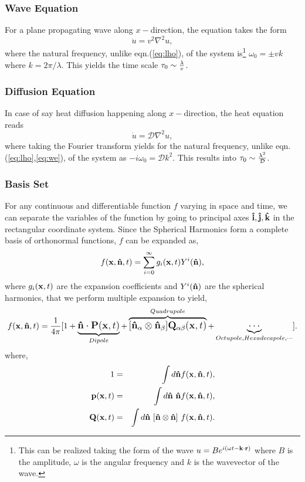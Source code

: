 \documentclass[onecolumn,12pt]{article}
\begin{document}
\subsubsection{Wave Equation}
For a plane propagating wave along $x-$direction, the equation takes the form
\begin{equation}
\label{eq:we}
\boxed{\ddot{u} = v^2 \nabla^2 u}, 
\end{equation}
where the natural frequency, unlike eqn.(\ref{eq:lho}), of the system is\footnote{This can be realized taking the form of the wave $u = Be^{i(\omega t-{\bf k}\cdot {\bf r})}$ where $B$ is the amplitude, $\omega$ is the angular frequency and $k$ is the wavevector of the wave.} $\omega_0 = \pm vk$ where $k = 2\pi/\lambda$. This yields the time scale $\tau_0 \sim {\lambda \over v}$.

\subsubsection{Diffusion Equation}
In case of say heat diffusion happening along $x-$direction, the heat equation reads
\begin{equation}
\label{eq:de}
\boxed{\dot{u} = \mathcal{D} \nabla^2 u}, 
\end{equation}
where taking the Fourier transform yields for the natural frequency, unlike eqn.(\ref{eq:lho},\ref{eq:we}), of the system as $-i\omega_0 = \mathcal{D} k^2$. This results into $\tau_0 \sim {\lambda^2 \over \mathcal{D}}$.

\subsubsection{Basis Set}
For any continuous and differentiable function $f$ varying in space and time, we can separate the variables of the function by going to principal axes ${\bf \hat{i}}, {\bf \hat{j}}, {\bf \hat{k}}$ in the rectangular coordinate system. Since the Spherical Harmonics form a complete basis of orthonormal functions,
$f$ can be expanded as,
\begin{equation}
f({\bf x},{\bf \hat{n}},t) = \sum_{i=0}^{\infty} g_i({\bf x},t) Y^i({\bf \hat{n}}), 
\end{equation}
where $g_i({\bf x},t)$ are the expansion coefficients and $Y^i({\bf \hat{n}})$ are the spherical harmonics, that we perform multiple expansion to yield, 
\begin{equation}
f({\bf x},{\bf \hat{n}},t) = \frac{1}{4\pi} \large[1 + 
\underbrace{{\bf \hat{n}} \cdot {\bf P}({\bf x},t)}_{Dipole} 
+ \overbrace{[{\bf \hat{n}}_\alpha \otimes {\bf \hat{n}}_\beta] {\bf Q}_{\alpha\beta}({\bf x},t)}^{Quadrupole} 
+ \underbrace{\cdots}_{Octupole, Hexadecapole, \cdots} \large].
\end{equation}
where, 
\begin{eqnarray}
1 &=& \int d{\bf \hat{n}} f({\bf x},{\bf \hat{n}},t), \\
{\bf p}({\bf x},t) &=& \int d{\bf \hat{n}}~ {\bf \hat{n}} f({\bf x},{\bf \hat{n}},t), \\
{\bf Q}({\bf x},t) &=& \int d{\bf \hat{n}}~ [{{\bf \hat{n}}\otimes{\bf \hat{n}}}] ~f({\bf x},{\bf \hat{n}},t).
\label{nemord}
\end{eqnarray} 
\end{document}
